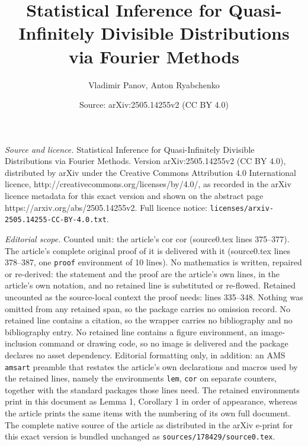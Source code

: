 \documentclass[10pt,a4paper]{amsart}
\title{Statistical Inference for Quasi-Infinitely Divisible Distributions via Fourier Methods}
\author{Vladimir Panov, Anton Ryabchenko}
\date{Source: arXiv:2505.14255v2 (CC BY 4.0)}
\begin{document}
\maketitle

\noindent\emph{Source and licence.} Statistical Inference for Quasi-Infinitely Divisible Distributions via Fourier Methods. Version arXiv:2505.14255v2 (CC BY 4.0), distributed by arXiv under the Creative Commons Attribution 4.0 International licence, http://creativecommons.org/licenses/by/4.0/, as recorded in the arXiv licence metadata for this exact version and shown on the abstract page https://arxiv.org/abs/2505.14255v2. Full licence notice: \texttt{licenses/arxiv-2505.14255-CC-BY-4.0.txt}.\par\smallskip

\noindent\textit{Editorial scope.} Counted unit: the article's cor cor (source0.tex lines 375--377). The article's complete original proof of it is delivered with it (source0.tex lines 378--387, one \texttt{proof} environment of 10 lines). No mathematics is written, repaired or re-derived: the statement and the proof are the article's own lines, in the article's own notation, and no retained line is substituted or re-flowed.  Retained uncounted as the source-local context the proof needs: lines 335--348.  Nothing was omitted from any retained span, so the package carries no omission record.  No retained line contains a citation, so the wrapper carries no bibliography and no bibliography entry.  No retained line contains a figure environment, an image-inclusion command or drawing code, so no image is delivered and the package declares no asset dependency.  Editorial formatting only, in addition: an AMS \texttt{amsart} preamble that restates the article's own declarations and macros used by the retained lines, namely the environments \texttt{lem}, \texttt{cor} on separate counters, together with the standard packages those lines need.  The retained environments print in this document as Lemma 1, Corollary 1 in order of appearance, whereas the article prints the same items with the numbering of its own full document.  The complete native source of the article as distributed in the arXiv e-print for this exact version is bundled unchanged as \texttt{sources/178429/source0.tex}.
\end{document}
